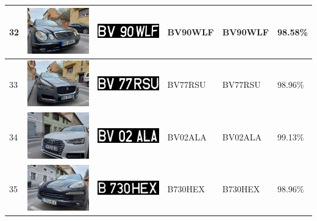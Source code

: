 \documentclass[a4paper,12pt]{report}
\begin{document}
\begin{longtable}{| m{0.6cm} | m{3cm} | m{3cm} | m{1.8cm} | m{1.8cm} | m{1.8cm} |}
    32  & \includegraphics[width=3cm,keepaspectratio]{dataset/17_s1.jpg}  & \includegraphics[width=3cm,keepaspectratio]{segmentari/32.jpg}  & BV90WLF             & BV90WLF              & 98.58\%    \\ \hline
    33  & \includegraphics[width=3cm,keepaspectratio]{dataset/18_s1.jpg}  & \includegraphics[width=3cm,keepaspectratio]{segmentari/33.jpg}  & BV77RSU             & BV77RSU              & 98.96\%    \\ \hline
    34  & \includegraphics[width=3cm,keepaspectratio]{dataset/19_d1.jpg}  & \includegraphics[width=3cm,keepaspectratio]{segmentari/34.jpg}  & BV02ALA             & BV02ALA              & 99.13\%    \\ \hline
    35  & \includegraphics[width=3cm,keepaspectratio]{dataset/20_d1.jpg}  & \includegraphics[width=3cm,keepaspectratio]{segmentari/35.jpg}  & B730HEX             & B730HEX              & 98.96\%    \\ \hline

\end{longtable}
\end{document}
